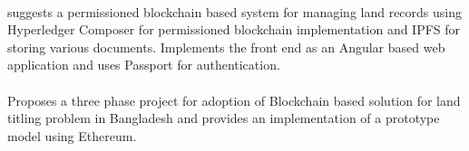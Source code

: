 \documentclass{article}
\begin{document}
        \paragraph{}
        \cite{8944471} suggests a permissioned blockchain based system for managing land records using Hyperledger Composer for permissioned blockchain implementation and IPFS for storing various documents. Implements the front end as an Angular based web application and uses Passport for authentication.

        \paragraph{}
        \cite{ALAM2020} Proposes a three phase project for adoption of Blockchain based solution for land titling problem in Bangladesh and provides an implementation of a prototype model using Ethereum. 



    \clearpage
    
    
\end{document}
